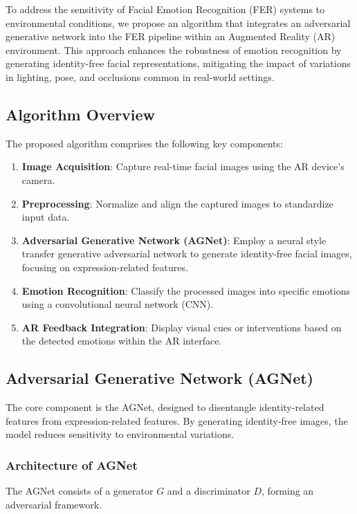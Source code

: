 \documentclass[lettersize,journal]{IEEEtran}
\begin{document}
To address the sensitivity of Facial Emotion Recognition (FER) systems to environmental conditions, we propose an algorithm that integrates an adversarial generative network into the FER pipeline within an Augmented Reality (AR) environment. This approach enhances the robustness of emotion recognition by generating identity-free facial representations, mitigating the impact of variations in lighting, pose, and occlusions common in real-world settings.

\subsection{Algorithm Overview}

The proposed algorithm comprises the following key components:

\begin{enumerate}
\item \textbf{Image Acquisition}: Capture real-time facial images using the AR device’s camera.
\item \textbf{Preprocessing}: Normalize and align the captured images to standardize input data.
\item \textbf{Adversarial Generative Network (AGNet)}: Employ a neural style transfer generative adversarial network to generate identity-free facial images, focusing on expression-related features.
\item \textbf{Emotion Recognition}: Classify the processed images into specific emotions using a convolutional neural network (CNN).
\item \textbf{AR Feedback Integration}: Display visual cues or interventions based on the detected emotions within the AR interface.
\end{enumerate}

\subsection{Adversarial Generative Network (AGNet)}

The core component is the AGNet, designed to disentangle identity-related features from expression-related features. By generating identity-free images, the model reduces sensitivity to environmental variations.

\subsubsection{Architecture of AGNet}

The AGNet consists of a generator $G$ and a discriminator $D$, forming an adversarial framework.
\end{document}
